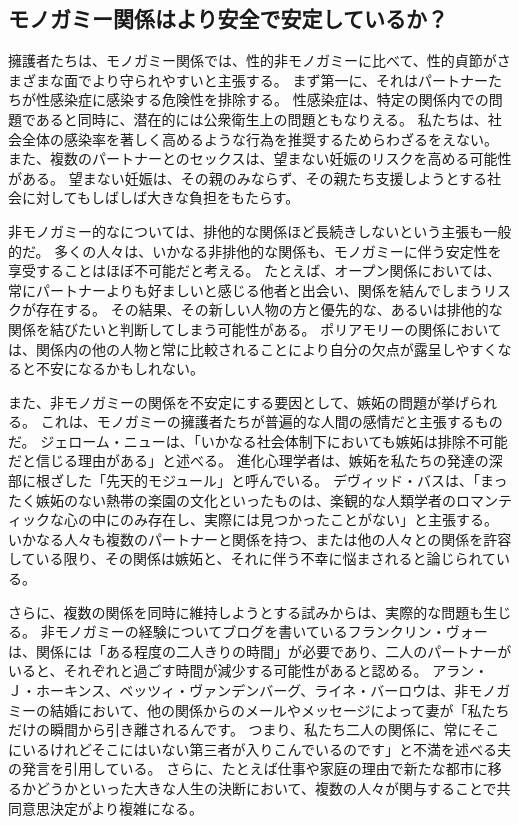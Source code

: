\documentclass[paper=a4,book,openany]{jlreq}
\begin{document}
\subsection{モノガミー関係はより安全で安定しているか？}

擁護者たちは、モノガミー関係では、性的非モノガミーに比べて、性的貞節がさまざまな面でより守られやすいと主張する。
まず第一に、それはパートナーたちが性感染症に感染する危険性を排除する。
性感染症は、特定の関係内での問題であると同時に、潜在的には公衆衛生上の問題ともなりえる。
私たちは、社会全体の感染率を著しく高めるような行為を推奨するためらわざるをえない。
また、複数のパートナーとのセックスは、望まない妊娠のリスクを高める可能性がある。
望まない妊娠は、その親のみならず、その親たち支援しようとする社会に対してもしばしば大きな負担をもたらす。

非モノガミー的なについては、排他的な関係ほど長続きしないという主張も一般的だ。
多くの人々は、いかなる非排他的な関係も、モノガミーに伴う安定性を享受することはほぼ不可能だと考える。
たとえば、オープン関係においては、常にパートナーよりも好ましいと感じる他者と出会い、関係を結んでしまうリスクが存在する。
その結果、その新しい人物の方と優先的な、あるいは排他的な関係を結びたいと判断してしまう可能性がある。
ポリアモリーの関係においては、関係内の他の人物と常に比較されることにより自分の欠点が露呈しやすくなると不安になるかもしれない。

また、非モノガミーの関係を不安定にする要因として、嫉妬の問題が挙げられる。
これは、モノガミーの擁護者たちが普遍的な人間の感情だと主張するものだ。
ジェローム・ニューは、「いかなる社会体制下においても嫉妬は排除不可能だと信じる理由がある」と述べる\citep[p.43]{new00:_jealous_thoug}。
進化心理学者は、嫉妬を私たちの発達の深部に根ざした「先天的モジュール」と呼んでいる。
デヴィッド・バスは、「まったく嫉妬のない熱帯の楽園の文化といったものは、楽観的な人類学者のロマンティックな心の中にのみ存在し、実際には見つかったことがない」と主張する\citep[p.961]{buss01:_human_natur_cultur}。
いかなる人々も複数のパートナーと関係を持つ、または他の人々との関係を許容している限り、その関係は嫉妬と、それに伴う不幸に悩まされると論じられている。

さらに、複数の関係を同時に維持しようとする試みからは、実際的な問題も生じる。
非モノガミーの経験についてブログを書いているフランクリン・ヴォーは、関係には「ある程度の二人きりの時間」が必要であり、二人のパートナーがいると、それぞれと過ごす時間が減少する可能性があると認める\citep{veaux09:_some_musin_time_manag}。
アラン・Ｊ・ホーキンス、ベッツィ・ヴァンデンバーグ、ライネ・バーロウは、非モノガミーの結婚において、他の関係からのメールやメッセージによって妻が「私たちだけの瞬間から引き離されるんです。
つまり、私たち二人の関係に、常にそこにいるけれどそこにはいない第三者が入りこんでいるのです」と不満を述べる夫の発言を引用している\citep{hawkins17:_new_math_consen_nonmon}。
さらに、たとえば仕事や家庭の理由で新たな都市に移るかどうかといった大きな人生の決断において、複数の人々が関与することで共同意思決定がより複雑になる。
\end{document}
